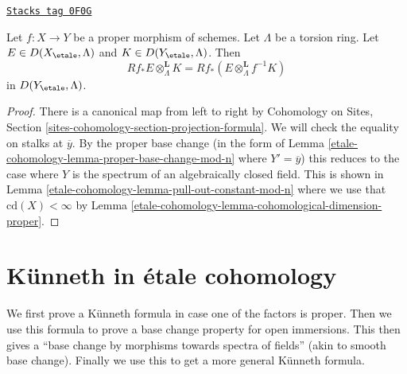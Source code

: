 \begin{lemma}
\label{etale-cohomology-lemma-projection-formula-proper-mod-n}
\href{https://stacks.math.columbia.edu/tag/0F0G}{\texttt{Stacks tag 0F0G}}

Let $f : X \to Y$ be a proper morphism of schemes. Let $\Lambda$
be a torsion ring. Let $E \in D(X_\etale, \Lambda)$ and
$K \in D(Y_\etale, \Lambda)$. Then
$$
Rf_*E \otimes_\Lambda^\mathbf{L} K =
Rf_*(E \otimes_\Lambda^\mathbf{L} f^{-1}K)
$$
in $D(Y_\etale, \Lambda)$.
\end{lemma}

\begin{proof}
There is a canonical map from left to right by
Cohomology on Sites, Section \ref{sites-cohomology-section-projection-formula}.
We will check the equality on stalks at $\overline{y}$.
By the proper base change (in the form of
Lemma \ref{etale-cohomology-lemma-proper-base-change-mod-n} where $Y' = \overline{y}$)
this reduces to the case where $Y$ is the spectrum of
an algebraically closed field.
This is shown in Lemma \ref{etale-cohomology-lemma-pull-out-constant-mod-n}
where we use that $\text{cd}(X) < \infty$ by
Lemma \ref{etale-cohomology-lemma-cohomological-dimension-proper}.
\end{proof}

\section{K\"unneth in \'etale cohomology}
\label{etale-cohomology-section-kunneth}
We first prove a K\"unneth formula in case one of the factors
is proper. Then we use this formula to prove a base change property
for open immersions. This then gives a
``base change by morphisms towards spectra of fields''
(akin to smooth base change).
Finally we use this to get a more general K\"unneth formula.

